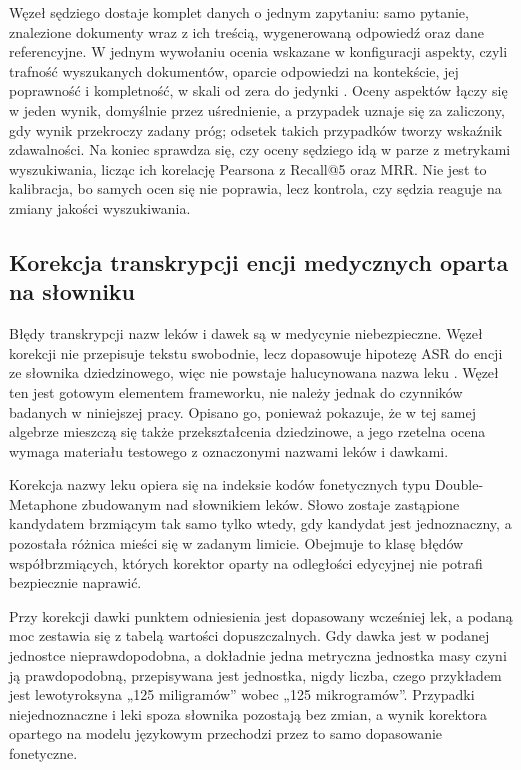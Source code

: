 Węzeł sędziego dostaje komplet danych o jednym zapytaniu: samo pytanie, znalezione dokumenty wraz
z ich treścią, wygenerowaną odpowiedź oraz dane referencyjne. W jednym wywołaniu ocenia wskazane w
konfiguracji aspekty, czyli trafność wyszukanych dokumentów, oparcie odpowiedzi na kontekście, jej
poprawność i
kompletność, w skali od zera do jedynki \cite{zheng2023judging, es2024ragas}. Oceny aspektów łączy
się w jeden wynik, domyślnie przez uśrednienie, a przypadek uznaje się za zaliczony, gdy wynik
przekroczy zadany próg; odsetek takich przypadków tworzy wskaźnik zdawalności. Na koniec sprawdza
się, czy oceny sędziego idą w parze z metrykami wyszukiwania, licząc ich korelację Pearsona z
Recall@5 oraz MRR. Nie jest to kalibracja, bo samych ocen się nie poprawia, lecz kontrola, czy
sędzia reaguje na zmiany jakości wyszukiwania.

\subsection{Korekcja transkrypcji encji medycznych oparta na słowniku}
Błędy transkrypcji nazw leków i dawek są w medycynie niebezpieczne. Węzeł korekcji nie przepisuje
tekstu swobodnie, lecz dopasowuje hipotezę ASR do encji ze słownika dziedzinowego, więc nie
powstaje halucynowana nazwa leku \cite{ji2023survey}. Węzeł ten jest gotowym elementem
frameworku, nie należy jednak do czynników badanych w niniejszej pracy. Opisano go, ponieważ
pokazuje, że w tej samej algebrze mieszczą się także przekształcenia dziedzinowe, a jego rzetelna
ocena wymaga materiału testowego z oznaczonymi nazwami leków i dawkami.

Korekcja nazwy leku opiera się na indeksie kodów fonetycznych typu Double-Metaphone
\cite{christen2006namematching} zbudowanym nad słownikiem leków. Słowo zostaje zastąpione kandydatem
brzmiącym tak samo tylko wtedy, gdy kandydat jest jednoznaczny, a pozostała różnica mieści się w
zadanym limicie. Obejmuje to klasę błędów współbrzmiących, których korektor oparty na odległości
edycyjnej nie potrafi bezpiecznie naprawić.

Przy korekcji dawki punktem odniesienia jest dopasowany wcześniej lek, a podaną moc zestawia się z
tabelą wartości dopuszczalnych. Gdy dawka jest w podanej jednostce nieprawdopodobna, a dokładnie
jedna metryczna jednostka masy czyni ją prawdopodobną, przepisywana jest jednostka, nigdy liczba,
czego przykładem jest lewotyroksyna „125 miligramów'' wobec „125 mikrogramów''. Przypadki
niejednoznaczne i leki spoza słownika pozostają bez zmian, a wynik korektora opartego na modelu
językowym przechodzi przez to samo dopasowanie fonetyczne.

